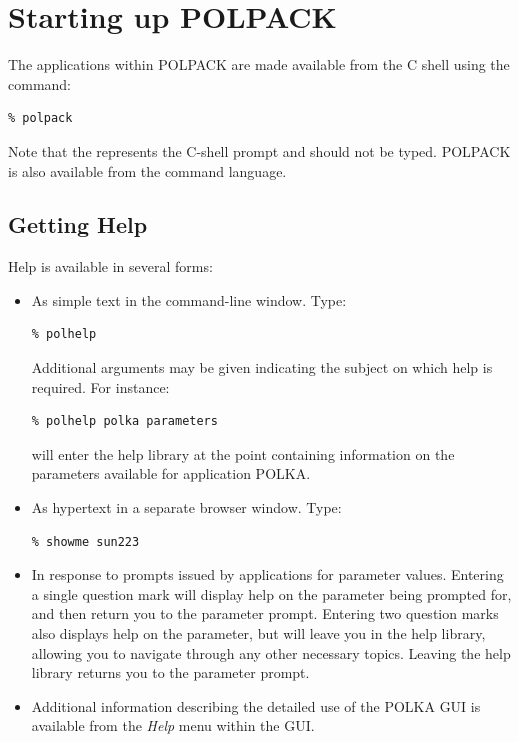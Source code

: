 \section{Starting up POLPACK}

The applications within POLPACK are made available from the C shell using the 
command:
\begin{myquote}
\begin{verbatim}
% polpack
\end{verbatim}
\end{myquote}

Note that the \text{\%} represents the C-shell prompt and should not be typed.
POLPACK is also available from the  command language.

\subsection{Getting Help}

Help is available in several forms: 
\begin{itemize}
\item As simple text in the command-line window. Type:

\begin{myquote}
\begin{verbatim}
% polhelp
\end{verbatim}
\end{myquote}

Additional arguments may be given indicating the subject on which help is
required. For instance:

\begin{myquote}
\begin{verbatim}
% polhelp polka parameters
\end{verbatim}
\end{myquote}

will enter the help library at the point containing information on the
parameters available for application POLKA.

\item As hypertext in a separate browser window. Type:

\begin{myquote}
\begin{verbatim}
% showme sun223
\end{verbatim}
\end{myquote}

\item In response to prompts issued by applications for parameter values. 
Entering a single question mark will display help on the parameter being
prompted for, and then return you to the parameter prompt. Entering two
question marks also displays help on the parameter, but will leave you in the
help library, allowing you to navigate through any other necessary
topics. Leaving the help library returns you to the parameter prompt.

\item Additional information describing the detailed use of the POLKA
GUI is available from the {\em Help} menu within the GUI.

\end{itemize}


